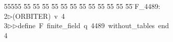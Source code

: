 %
%
\begin{tabbing}
55555 \= 55 \= 55 \= 55 \= 55 \= 55 \= 55 \= 55 \= 55 \= 55 \= 55 \= 55 \= 55 \= \>F\_4489:\\[0pt]
2\>$\triangleright$\>(ORBITER)\ v\ 4\ \\[0pt]
3\>$\triangleright$\>$\triangleright$\>define\ F\ finite\_field\ q\ 4489\ without\_tables\ end\ \\[0pt]
4\>\end{tabbing}
